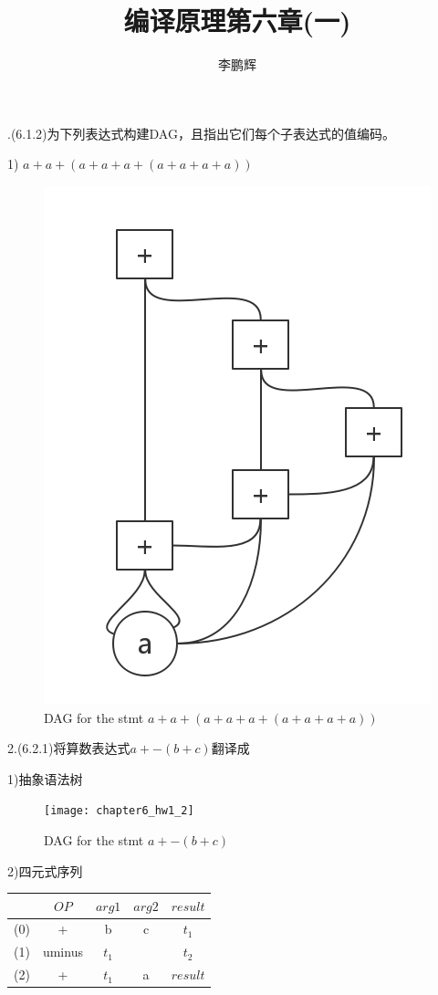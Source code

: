 \documentclass[a4paper, 16pt]{article}
\title{编译原理第六章(一)}
\author{李鹏辉}
\begin{document}
.(6.1.2)为下列表达式构建DAG，且指出它们每个子表达式的值编码。

1) $a+a+(a+a+a+(a+a+a+a))$
\begin{figure}[H]
\centering
\includegraphics[scale=0.6]{chapter6_hw1_1}
\caption{DAG for the stmt $a+a+(a+a+a+(a+a+a+a))$}
\end{figure}



2.(6.2.1)将算数表达式$a+-(b+c)$翻译成

1)抽象语法树
\begin{figure}[H]
\centering
\texttt{[image: chapter6\_hw1\_2]}
\caption{DAG for the stmt $a+-(b+c)$}
\end{figure}

2)四元式序列
\begin{table}[H]
\centering
\begin{tabular}{c|c|c|c|c}
\hline
\hline
 &$OP$& $arg1$ & $arg2$ & $result$ \\
\hline
(0) & + & b & c& $t_1$ \\
(1) & uminus & $t_1$ &  & $t_2$\\
(2) & + & $t_1$ & a & $result$ \\
\hline
\end{tabular}
\end{table}
\end{document}
